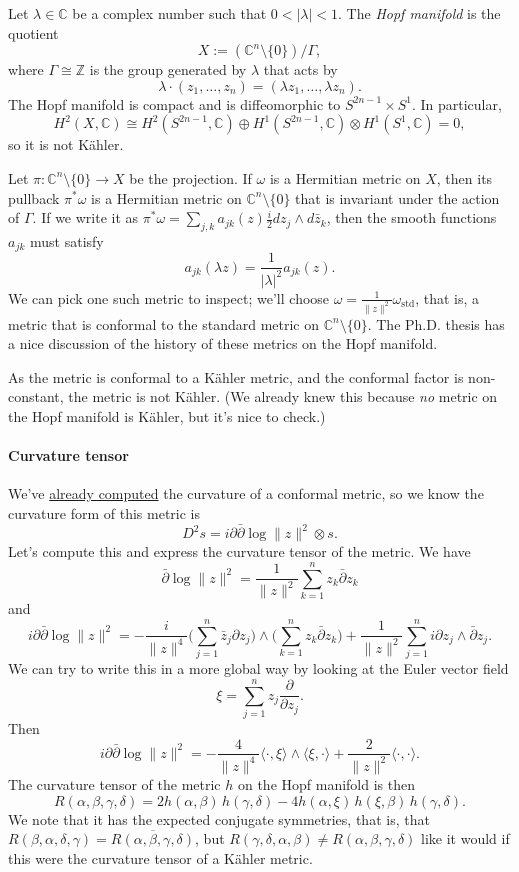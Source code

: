 \documentclass[11pt]{article}
\newcommand{\kk}[1]{\mathbb{#1}}
\begin{document}
Let \(\lambda \in \kk C\) be a complex number such that \(0 < |\lambda| < 1\). The \emph{Hopf manifold} is the quotient
$$
X := (\kk C^n \setminus \{0\}) / \Gamma,
$$
where \(\Gamma \cong \kk Z\) is the group generated by \(\lambda\) that acts by
$$
\lambda \cdot (z_1, \ldots, z_n) = (\lambda z_1, \ldots, \lambda z_n).
$$
The Hopf manifold is compact and is diffeomorphic to \(S^{2n-1} \times S^1\). In particular,
$$
H^2(X, \kk C) \cong H^2(S^{2n-1}, \kk C) \oplus H^1(S^{2n-1}, \kk C) \otimes H^1(S^1, \kk C) = 0,
$$
so it is not K\"ahler.

Let \(\pi : \kk C^n \setminus \{0\} \to X\) be the projection. If \(\omega\) is a Hermitian metric on \(X\), then its pullback \(\pi^*\omega\) is a Hermitian metric on \(\kk C^n \setminus \{0\}\) that is invariant under the action of \(\Gamma\). If we write it as \(\pi^*\omega = \sum_{j,k} a_{jk}(z) \tfrac{i}{2} dz_j \wedge d\bar z_k\), then the smooth functions \(a_{jk}\) must satisfy
$$
a_{jk}(\lambda z) = \frac{1}{|\lambda|^2} a_{jk}(z).
$$
We can pick one such metric to inspect; we'll choose \(\omega = \frac{1}{\|z\|^2} \omega_{\mathrm{std}}\), that is, a metric that is conformal to the standard metric on \(\kk C^n \setminus \{0\}\). The Ph.D. thesis \cite{istrati:tel-02156198} has a nice discussion of the history of these metrics on the Hopf manifold.

As the metric is conformal to a K\"ahler metric, and the conformal factor is non-constant, the metric is not K\"ahler. (We already knew this because \emph{no} metric on the Hopf manifold is K\"ahler, but it's nice to check.)


\paragraph{Curvature tensor}
\label{sec:org96d544d}

We've \hyperref[sec:org65fcbad]{already computed} the curvature of a conformal metric, so we know the curvature form of this metric is
$$
D^2 s = i\partial\bar\partial \log \|z\|^2 \otimes s.
$$
Let's compute this and express the curvature tensor of the metric. We have
$$
\bar\partial \log \|z\|^2
= \frac{1}{\|z\|^2} \sum_{k=1}^n z_k \bar\partial z_k
$$
and
$$
i\partial\bar\partial \log \|z\|^2
= - \frac{i}{\|z\|^4} \biggl(\sum_{j=1}^n \bar z_j \partial z_j \biggr) \wedge \biggl(\sum_{k=1}^n z_k \bar\partial z_k\biggr) + \frac{1}{\|z\|^2} \sum_{j=1}^n i\partial z_j \wedge \bar\partial z_j.
$$
We can try to write this in a more global way by looking at the Euler vector field
$$
\xi = \sum_{j=1}^n z_j \frac{\partial}{\partial z_j}.
$$
Then
$$
i\partial\bar\partial \log \|z\|^2
= -\frac{4}{\|z\|^4} \langle \cdot, \xi \rangle \wedge \langle \xi, \cdot \rangle + \frac{2}{\|z\|^2} \langle \cdot, \cdot \rangle.
$$
The curvature tensor of the metric \(h\) on the Hopf manifold is then
$$
R(\alpha,\beta,\gamma,\delta)
= 2 h(\alpha, \beta)\,h(\gamma, \delta) - 4 h(\alpha, \xi)\, h(\xi, \beta)\,h(\gamma, \delta).
$$
We note that it has the expected conjugate symmetries, that is, that \(R(\beta, \alpha, \delta, \gamma) = \overline{R(\alpha, \beta, \gamma, \delta)}\), but \(R(\gamma, \delta, \alpha, \beta) \not= R(\alpha, \beta, \gamma, \delta)\) like it would if this were the curvature tensor of a K\"ahler metric.
\end{document}
